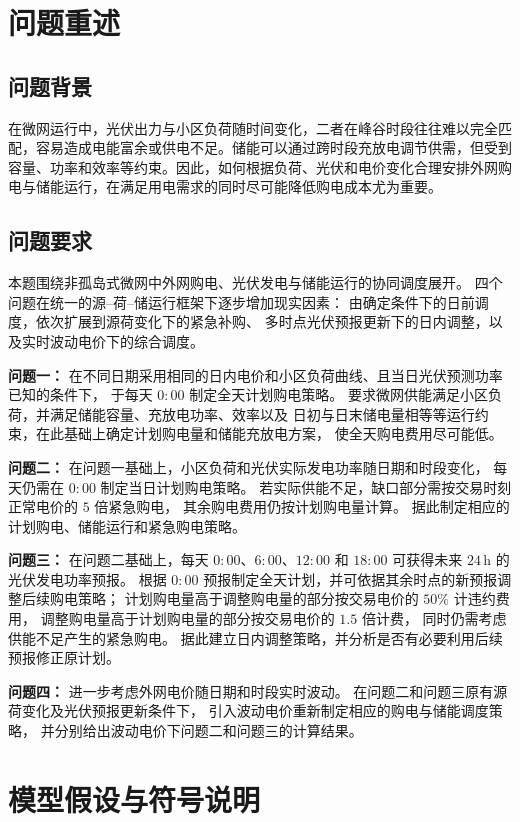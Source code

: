 \documentclass[zihao=-4,a4paper,UTF8,fontset=none]{ctexart}
\begin{document}
\section{问题重述}
\subsection{问题背景}
在微网运行中，光伏出力与小区负荷随时间变化，二者在峰谷时段往往难以完全匹配，容易造成电能富余或供电不足。储能可以通过跨时段充放电调节供需，但受到容量、功率和效率等约束。因此，如何根据负荷、光伏和电价变化合理安排外网购电与储能运行，在满足用电需求的同时尽可能降低购电成本尤为重要。

\subsection{问题要求}

本题围绕非孤岛式微网中外网购电、光伏发电与储能运行的协同调度展开。
四个问题在统一的源--荷--储运行框架下逐步增加现实因素：
由确定条件下的日前调度，依次扩展到源荷变化下的紧急补购、
多时点光伏预报更新下的日内调整，以及实时波动电价下的综合调度。

\textbf{问题一：}
在不同日期采用相同的日内电价和小区负荷曲线、且当日光伏预测功率已知的条件下，
于每天 $0{:}00$ 制定全天计划购电策略。
要求微网供能满足小区负荷，并满足储能容量、充放电功率、效率以及
日初与日末储电量相等等运行约束，在此基础上确定计划购电量和储能充放电方案，
使全天购电费用尽可能低。

\textbf{问题二：}
在问题一基础上，小区负荷和光伏实际发电功率随日期和时段变化，
每天仍需在 $0{:}00$ 制定当日计划购电策略。
若实际供能不足，缺口部分需按交易时刻正常电价的 $5$ 倍紧急购电，
其余购电费用仍按计划购电量计算。
据此制定相应的计划购电、储能运行和紧急购电策略。

\textbf{问题三：}
在问题二基础上，每天 $0{:}00$、$6{:}00$、$12{:}00$ 和
$18{:}00$ 可获得未来 $24\,\mathrm h$ 的光伏发电功率预报。
根据 $0{:}00$ 预报制定全天计划，并可依据其余时点的新预报调整后续购电策略；
计划购电量高于调整购电量的部分按交易电价的 $50\%$ 计违约费用，
调整购电量高于计划购电量的部分按交易电价的 $1.5$ 倍计费，
同时仍需考虑供能不足产生的紧急购电。
据此建立日内调整策略，并分析是否有必要利用后续预报修正原计划。

\textbf{问题四：}
进一步考虑外网电价随日期和时段实时波动。
在问题二和问题三原有源荷变化及光伏预报更新条件下，
引入波动电价重新制定相应的购电与储能调度策略，
并分别给出波动电价下问题二和问题三的计算结果。




\section{模型假设与符号说明}
\end{document}
